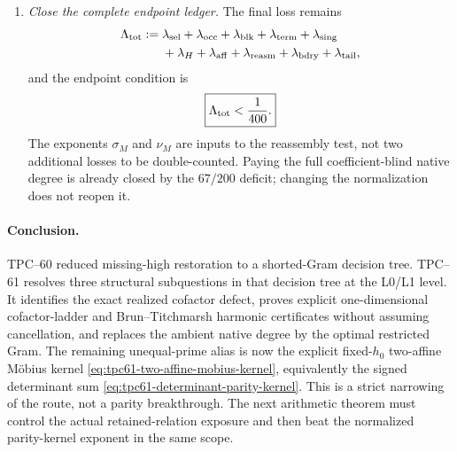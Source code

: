 \begin{enumerate}[label=\textbf{Door \Alph*.},leftmargin=3.8em]
 \item \emph{Close the complete endpoint ledger.}
       The final loss remains
       \begin{equation}
        \begin{aligned}
        \Lambda_{\rm tot}:={}&
        \lambda_{\rm sel}+\lambda_{\rm occ}
        +\lambda_{\rm blk}+\lambda_{\rm term}
        +\lambda_{\rm sing}\\
        &+\lambda_H+\lambda_{\rm aff}
        +\lambda_{\rm reasm}
        +\lambda_{\rm bdry}+\lambda_{\rm tail},
        \end{aligned}
        \label{eq:tpc61-final-complete-ledger}
       \end{equation}
       and the endpoint condition is
       \begin{equation}
        \boxed{\Lambda_{\rm tot}<\frac1{400}.}
        \label{eq:tpc61-final-endpoint-condition}
       \end{equation}
       The exponents \(\sigma_M\) and \(\nu_M\) are inputs to the
       reassembly test, not two additional losses to be double-counted.
       Paying the full coefficient-blind native degree is already closed
       by the \(67/200\) deficit; changing the normalization does not reopen
       it.
\end{enumerate}

\paragraph{Conclusion.}
TPC--60 reduced missing-high restoration to a shorted-Gram decision tree.
TPC--61 resolves three structural subquestions in that decision tree at
the L0/L1 level.  It identifies the
exact realized cofactor defect, proves explicit one-dimensional
cofactor-ladder and Brun--Titchmarsh harmonic certificates without assuming
cancellation, and replaces the ambient native degree by the optimal
restricted Gram.
The remaining unequal-prime alias is now the explicit fixed-\(h_0\)
two-affine M\"obius kernel
\eqref{eq:tpc61-two-affine-mobius-kernel}, equivalently the signed
determinant sum \eqref{eq:tpc61-determinant-parity-kernel}.  This is a
strict narrowing of the route, not a parity breakthrough.  The next
arithmetic theorem must control the actual retained-relation exposure and
then beat the normalized parity-kernel exponent in the same scope.
